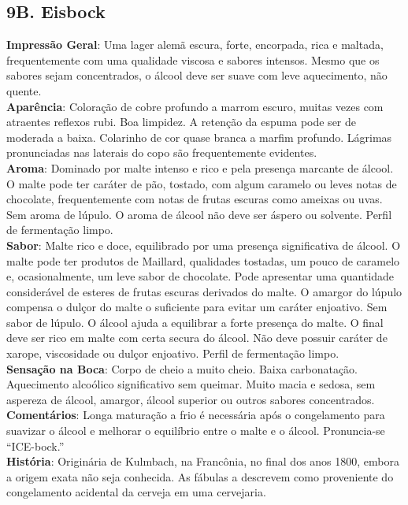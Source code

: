 \subsection*{9B. Eisbock}
\textbf{Impressão Geral}: Uma lager alemã escura, forte, encorpada, rica e maltada, frequentemente com uma qualidade viscosa e sabores intensos. Mesmo que os sabores sejam concentrados, o álcool deve ser suave com leve aquecimento, não quente. \\
\textbf{Aparência}: Coloração de cobre profundo a marrom escuro, muitas vezes com atraentes reflexos rubi. Boa limpidez. A retenção da espuma pode ser de moderada a baixa. Colarinho de cor quase branca a marfim profundo. Lágrimas pronunciadas nas laterais do copo são frequentemente evidentes. \\
\textbf{Aroma}: Dominado por malte intenso e rico e pela presença marcante de álcool. O malte pode ter caráter de pão, tostado, com algum caramelo ou leves notas de chocolate, frequentemente com notas de frutas escuras como ameixas ou uvas. Sem aroma de lúpulo. O aroma de álcool não deve ser áspero ou solvente. Perfil de fermentação limpo. \\
\textbf{Sabor}: Malte rico e doce, equilibrado por uma presença significativa de álcool. O malte pode ter produtos de Maillard, qualidades tostadas, um pouco de caramelo e, ocasionalmente, um leve sabor de chocolate. Pode apresentar uma quantidade considerável de esteres de frutas escuras derivados do malte. O amargor do lúpulo compensa o dulçor do malte o suficiente para evitar um caráter enjoativo. Sem sabor de lúpulo. O álcool ajuda a equilibrar a forte presença do malte. O final deve ser rico em malte com certa secura do álcool. Não deve possuir caráter de xarope, viscosidade ou dulçor enjoativo. Perfil de fermentação limpo. \\
\textbf{Sensação na Boca}: Corpo de cheio a muito cheio. Baixa carbonatação. Aquecimento alcoólico significativo sem queimar. Muito macia e sedosa, sem aspereza de álcool, amargor, álcool superior ou outros sabores concentrados. \\
\textbf{Comentários}: Longa maturação a frio é necessária após o congelamento para suavizar o álcool e melhorar o equilíbrio entre o malte e o álcool. Pronuncia-se “ICE-bock.” \\
\textbf{História}: Originária de Kulmbach, na Francônia, no final dos anos 1800, embora a origem exata não seja conhecida. As fábulas a descrevem como proveniente do congelamento acidental da cerveja em uma cervejaria. \\
